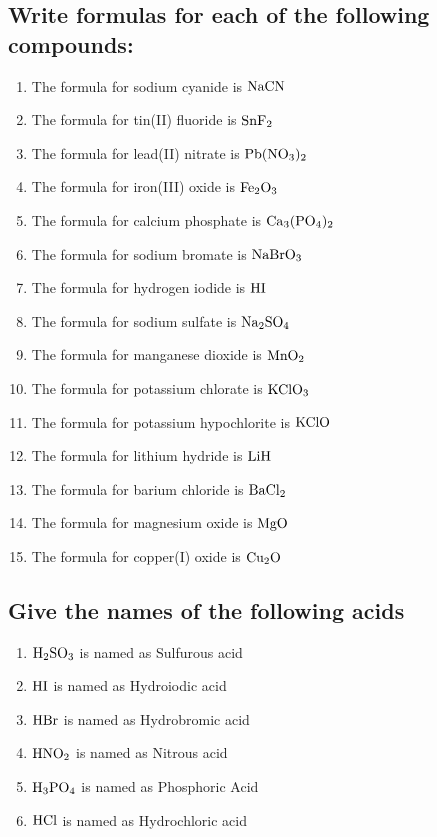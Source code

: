 \documentclass[11pt]{article}
\begin{document}
\subsection{Write formulas for each of the following compounds:}
\label{sec:org3a5d347}
\begin{enumerate}
\item The formula for sodium cyanide is \(\ce{NaCN}\)
\item The formula for tin(II) fluoride is \(\ce{SnF2}\)
\item The formula for lead(II) nitrate is \(\ce{Pb(NO3)2}\)
\item The formula for iron(III) oxide is \(\ce{Fe2O3}\)
\item The formula for calcium phosphate is \(\ce{Ca3(PO4)2}\)
\item The formula for sodium bromate is \(\ce{NaBrO3}\)
\item The formula for hydrogen iodide is \(\ce{HI}\)
\item The formula for sodium sulfate is \(\ce{Na2SO4}\)
\item The formula for manganese dioxide is \(\ce{MnO2}\)
\item The formula for potassium chlorate is \(\ce{KClO3}\)
\item The formula for potassium hypochlorite is \(\ce{KClO}\)
\item The formula for lithium hydride is \(\ce{LiH}\)
\item The formula for barium chloride is \(\ce{BaCl2}\)
\item The formula for magnesium oxide is \(\ce{MgO}\)
\item The formula for copper(I) oxide is \(\ce{Cu2O}\)
\end{enumerate}

\subsection{Give the names of the following acids}
\label{sec:orgba4758f}
\begin{enumerate}
\item \(\ce{H2SO3}\) is named as Sulfurous acid
\item \(\ce{HI}\) is named as Hydroiodic acid
\item \(\ce{HBr}\) is named as Hydrobromic acid
\item \(\ce{HNO2}\) is named as Nitrous acid
\item \(\ce{H3PO4}\) is named as Phosphoric Acid
\item \(\ce{HCl}\) is named as Hydrochloric acid
\end{enumerate}
\end{document}
